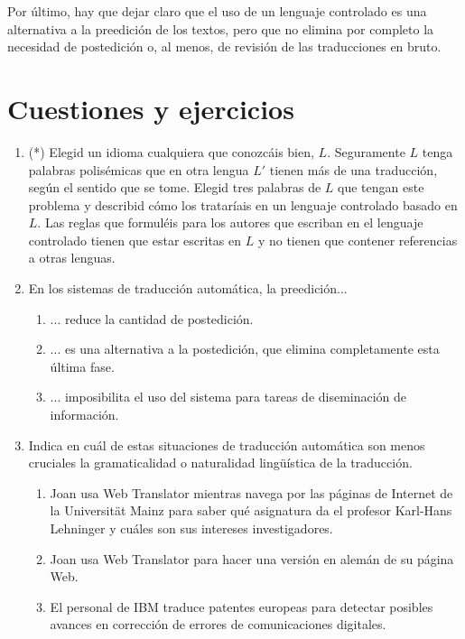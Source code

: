 Por último, hay que dejar claro que el uso de un lenguaje controlado es una alternativa a la preedición de los textos, pero que no elimina por completo la necesidad de postedición o, al menos, de revisión de las traducciones en bruto. 

\section{Cuestiones y ejercicios} \begin{enumerate} \item(*) Elegid un idioma cualquiera que conozcáis bien, $L$. Seguramente $L$ tenga palabras polisémicas que en otra lengua $L'$ tienen más de una traducción, según el sentido que se tome. Elegid tres palabras de $L$ que tengan este problema y describid cómo los trataríais en un lenguaje controlado basado en $L$. Las reglas que formuléis para los autores que escriban en el lenguaje controlado tienen que estar escritas en $L$ y no tienen que contener referencias a otras lenguas. 

\item En los sistemas de traducción automática, la preedición... \begin{enumerate} \item ... reduce la cantidad de postedición. \item ... es una alternativa a la postedición, que elimina completamente esta última fase. \item ... imposibilita el uso del sistema para tareas de diseminación de información. \end{enumerate} 

\item Indica en cuál de estas situaciones de traducción automática son menos cruciales la gramaticalidad o naturalidad lingüística de la traducción. \begin{enumerate} \item Joan usa Web Translator mientras navega por las páginas de Internet de la Universität Mainz para saber qué asignatura da el profesor Karl-Hans Lehninger y cuáles son sus intereses investigadores. \item Joan usa Web Translator para hacer una versión en alemán de su página Web. \item El personal de IBM traduce patentes europeas para detectar posibles avances en corrección de errores de comunicaciones digitales. \end{enumerate} 


\end{enumerate}
